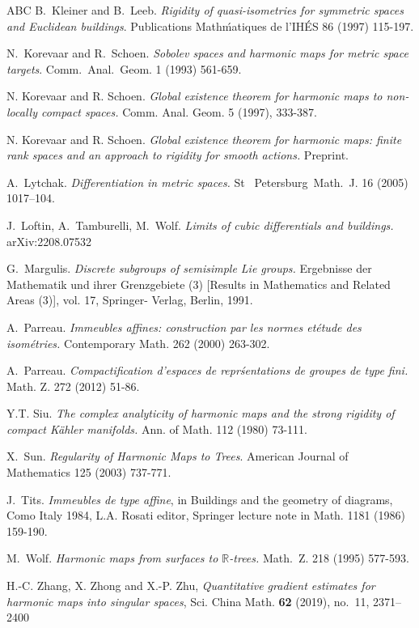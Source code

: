 \documentclass[12pt]{amsart}
\theoremstyle{definition}
\numberwithin{equation}{section}
\newcommand{\R}{\mathbb R}
\begin{document}
\begin{thebibliography}{ABC}
  B.~Kleiner and B.~Leeb.  {\it Rigidity of quasi-isometries for symmetric spaces and Euclidean buildings}.
Publications Math\'matiques de l'IH\'ES 86 (1997) 115-197. 

  N.~Korevaar and R.~Schoen.  {\it Sobolev spaces and harmonic maps for metric space targets}.
Comm.~Anal.~Geom. 1 (1993) 561-659.


  N. Korevaar and R. Schoen.  {\it
Global existence theorem for harmonic maps to non-locally compact spaces.}  Comm.  Anal. Geom. 5 (1997), 333-387.

  N. Korevaar and R. Schoen.  {\it
Global existence theorem for harmonic maps:  finite rank spaces and an approach to rigidity for smooth actions.} Preprint.


 A.~Lytchak.  {\it Differentiation in metric spaces.} St~ Petersburg~Math.~J. 16 (2005) 1017–104.

 J.~Loftin, A.~Tamburelli, M.~Wolf. {\it Limits of cubic differentials and buildings.} arXiv:2208.07532

 G.~Margulis.  {\it Discrete subgroups of semisimple Lie groups.} Ergebnisse der Mathematik
und ihrer Grenzgebiete (3) [Results in Mathematics and Related Areas (3)], vol. 17, Springer-
Verlag, Berlin, 1991.

 A.~Parreau.  {\it
Immeubles affines: construction par les normes et\'etude des isom\'etries.} Contemporary Math. 262
(2000) 263-302.

 A.~Parreau.  {\it Compactification d’espaces de repr\'sentations de groupes de type fini. }Math. Z. 272 (2012) 51-86. 

  Y.T. Siu.  {\it The complex analyticity of
harmonic maps and the strong rigidity of compact K\"{a}hler
manifolds.}  Ann. of Math. 112 (1980) 73-111.

 X.~Sun.  {\it Regularity of Harmonic Maps to Trees}.
American Journal of Mathematics 125 (2003) 737-771.

 J.~Tits.  {\it Immeubles de type affine},  in Buildings and the geometry of diagrams, Como Italy 1984, L.A. Rosati
editor, Springer lecture note in Math. 1181 (1986) 159-190.

 M.~Wolf.  {\it Harmonic maps from surfaces to $\R$-trees.} Math.~Z. 218 (1995) 577-593.

H.-C. Zhang, X. Zhong and X.-P. Zhu, {\it Quantitative gradient estimates for harmonic maps into singular spaces}, Sci. China Math. {\bf 62} (2019), no.~11, 2371--2400
\end{thebibliography}
\end{document}
